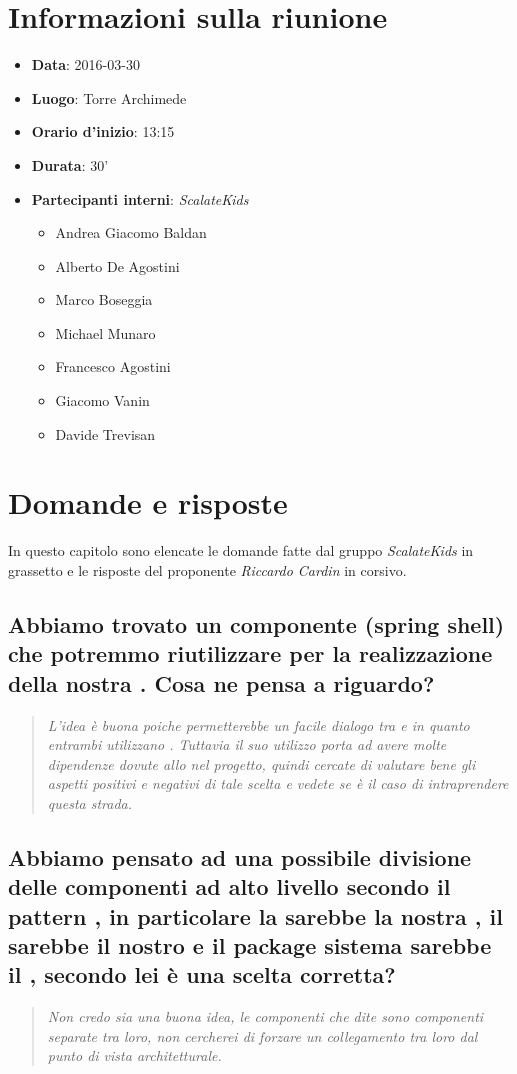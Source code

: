 \documentclass{scalatekids-article}
\begin{document}
\section{Informazioni sulla riunione}
\begin{itemize}
\item \textbf{Data}: 2016-03-30
\item \textbf{Luogo}: Torre Archimede
\item \textbf{Orario d'inizio}: 13:15
\item \textbf{Durata}: 30'
\item \textbf{Partecipanti interni}: \textit{ScalateKids}
  \begin{itemize}
  \item Andrea Giacomo Baldan 
  \item Alberto De Agostini
  \item Marco Boseggia
  \item Michael Munaro
  \item Francesco Agostini
  \item Giacomo Vanin
  \item Davide Trevisan
  \end{itemize}
\end{itemize}

\section{Domande e risposte}
In questo capitolo sono elencate le domande fatte dal gruppo \textit{ScalateKids} in grassetto e le risposte del proponente \textit{Riccardo Cardin} in corsivo.

\subsection{Abbiamo trovato un componente (spring shell) che potremmo riutilizzare per la realizzazione della nostra . Cosa ne pensa a riguardo?}
\begin{quote}
  \textit{L'idea è buona poiche permetterebbe un facile dialogo tra  e  in quanto entrambi utilizzano . Tuttavia il suo utilizzo porta ad avere molte dipendenze dovute allo  nel progetto, quindi cercate di valutare bene gli aspetti positivi e negativi di tale scelta e vedete se è il caso di intraprendere questa strada.}
\end{quote}
\subsection{Abbiamo pensato ad una possibile divisione delle componenti ad alto livello secondo il pattern , in particolare la  sarebbe la nostra , il  sarebbe il nostro  e il package sistema sarebbe il , secondo lei è una scelta corretta?\\}
\begin{quote}
  \textit{Non credo sia una buona idea, le componenti che dite sono componenti separate tra loro, non cercherei di forzare un collegamento tra loro dal punto di vista architetturale.}
\end{quote}
\end{document}
